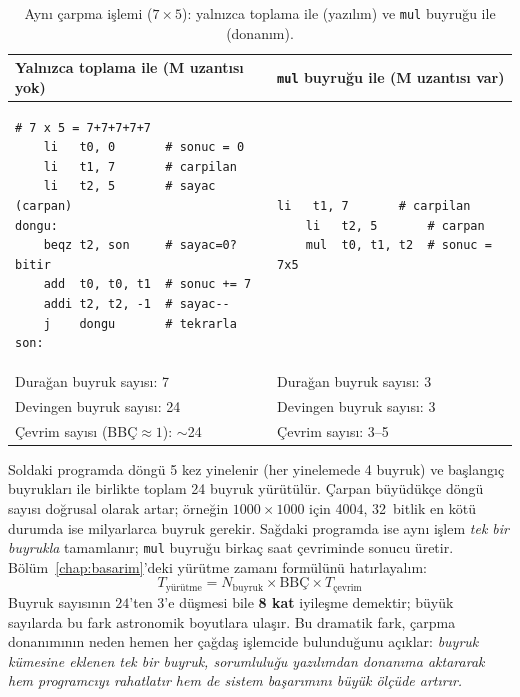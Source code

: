 \begin{table}[htbp]
\centering
\caption[Yazılım ve donanım çarpma karşılaştırması]{Aynı çarpma işlemi ($7 \times 5$): yalnızca toplama ile (yazılım) ve \texttt{mul} buyruğu ile (donanım).}
\label{tab:carpma-yazilim-donanim}
\small
\begin{tabular}{p{6.8cm}p{6.8cm}}
\toprule
\textbf{Yalnızca toplama ile (M uzantısı yok)} & \textbf{\texttt{mul} buyruğu ile (M uzantısı var)} \\
\midrule
\begin{minipage}[t]{6.5cm}
\begin{lstlisting}[style=riscv, xleftmargin=0pt]
# 7 x 5 = 7+7+7+7+7
    li   t0, 0       # sonuc = 0
    li   t1, 7       # carpilan
    li   t2, 5       # sayac (carpan)
dongu:
    beqz t2, son     # sayac=0? bitir
    add  t0, t0, t1  # sonuc += 7
    addi t2, t2, -1  # sayac--
    j    dongu       # tekrarla
son:
\end{lstlisting}
\end{minipage}
&
\begin{minipage}[t]{6.5cm}
\begin{lstlisting}[style=riscv, xleftmargin=0pt]
    li   t1, 7       # carpilan
    li   t2, 5       # carpan
    mul  t0, t1, t2  # sonuc = 7x5
\end{lstlisting}
\end{minipage}
\\
\midrule
Durağan buyruk sayısı: 7 & Durağan buyruk sayısı: 3 \\
Devingen buyruk sayısı: 24 & Devingen buyruk sayısı: 3 \\
Çevrim sayısı (BBÇ${}\approx 1$): $\sim$24 & Çevrim sayısı: 3--5 \\
\bottomrule
\end{tabular}
\end{table}

Soldaki programda döngü 5 kez yinelenir (her yinelemede 4 buyruk) ve başlangıç buyrukları ile birlikte toplam 24 buyruk yürütülür. Çarpan büyüdükçe döngü sayısı doğrusal olarak artar; örneğin $1000 \times 1000$ için 4004, 32~bitlik en kötü durumda ise milyarlarca buyruk gerekir. Sağdaki programda ise aynı işlem \emph{tek bir buyrukla} tamamlanır; \texttt{mul} buyruğu birkaç saat çevriminde sonucu üretir. Bölüm~\ref{chap:basarim}'deki yürütme zamanı formülünü hatırlayalım:
%
\[
T_{\text{yürütme}} = N_{\text{buyruk}} \times \text{BBÇ} \times T_{\text{çevrim}}
\]
%
Buyruk sayısının $24$'ten $3$'e düşmesi bile \textbf{8 kat} iyileşme demektir; büyük sayılarda bu fark astronomik boyutlara ulaşır. Bu dramatik fark, çarpma donanımının neden hemen her çağdaş işlemcide bulunduğunu açıklar: \emph{buyruk kümesine eklenen tek bir buyruk, sorumluluğu yazılımdan donanıma aktararak hem programcıyı rahatlatır hem de sistem başarımını büyük ölçüde artırır.}

